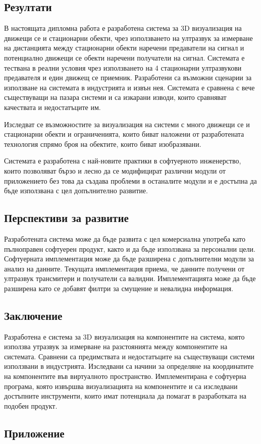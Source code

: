 \subsection{Резултати}

В настоящата дипломна работа е разработена система за 3D визуализация на движещи се и стационарни обекти, чрез използването на ултразвук за измерване на дистанцията между стационарни обекти наречени предаватели на сигнал и потенциално движещи се обекти наречени получатели на сигнал. Системата е тествана в реални условия чрез използването на 4 стационарни ултразвукови предавателя и един движещ се приемник. Разработени са възможни сценарии за използване на системата в индустрията и извън нея. Системата е сравнена с вече съществуващи на пазара системи и са изкарани изводи, които сравняват качествата и недостатъците им.

Изследват се възможностите за визуализация на системи с много движещи се и стационарни обекти и ограниченията, които биват наложени от разработената технология спрямо броя на обектите, които биват изобразявани.

Системата е разработена с най-новите практики в софтуерното инженерство, които позволяват бързо и лесно да се модифицират различни модули от приложението без това да създава проблеми в останалите модули и е достъпна да бъде използвана с цел допълнително развитие.

\subsection{Перспективи за развитие}
Разработената система може да бъде развита с цел комерсиална употреба като пълноправен софтуерен продукт, както и да бъде използвана за персонални цели. Софтуерната имплементация може да бъде разширена с допълнителни модули за анализ на данните. Текущата имплементация приема, че данните получени от ултразвук трансмитери и получатели са валидни. Имплементацията може да бъде разширена като се добавят филтри за смущение и невалидна информация.

\subsection{Заключение}
Разработена е система за 3D визуализация на компонентите на система, която използва утразвук за измерване на разстоянията между компонентите на системата. Сравнени са предимствата и недостатъците на съществуващи системи използвани в индустрията. Изследвани са начини за определяне на координатите на компонентите във виртуалното пространство. Имплементирана е софтуерна програма, която извършва визуализацията на компонентите и са изследвани достъпните инструменти, които имат потенциала да помагат в разработката на подобен продукт.

\subsection{Приложение}
